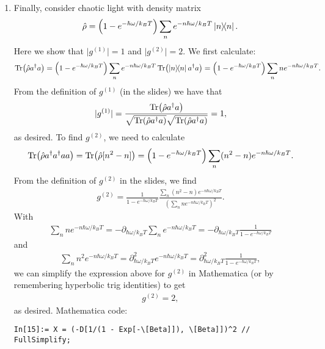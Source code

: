 \documentclass{article}
\theoremstyle{definition}
\newcommand{\p}{\partial}
\newcommand{\f}[2]{\frac{#1}{#2}}
\newcommand{\lp}{\left(}
\newcommand{\rp}{\right)}
\begin{document}
\begin{enumerate}[label=\alph*)]
\item Finally, consider chaotic light with density matrix
\begin{align*}
\hat{\rho} = \lp  1 - e^{-\hbar \omega / k_B T} \rp \sum_n e^{-n\hbar \omega / k_B T} \ketbra{n}.
\end{align*}
Here we show that $\vert g^{(1)} \vert = 1$ and $\vert g^{(2)} \vert = 2$. We first calculate:
\begin{align*}
\Tr(\hat{\rho}  a^\dagger a ) = \lp  1 - e^{-\hbar \omega / k_B T} \rp \sum_{n} e^{-n\hbar \omega /k_B T} \Tr(\ketbra{n} a^\dagger a ) = \lp  1 - e^{-\hbar \omega / k_B T} \rp \sum_n n e^{-n\hbar \omega/k_B T}. 
\end{align*}
From the definition of $g^{(1)}$ (in the slides) we have that
\begin{align*}
\vert g^{(1)}\vert = \f{\Tr(\hat{\rho} a^\dagger a )}{\sqrt{\Tr(\hat{\rho} a^\dagger a )}  \sqrt{\Tr(\hat{\rho} a^\dagger a )} } = 1,
\end{align*}
as desired. To find $g^{(2)}$, we need to calculate
\begin{align*}
\Tr(\hat{\rho} a^\dagger a^\dagger a a ) = \Tr(\hat{\rho}[n^2 - n]) = \lp 1 - e^{-\hbar \omega/k_B T} \rp \sum_n (n^2 - n) e^{-n\hbar \omega / k_B T}. 
\end{align*}
From the definition of $g^{(2)}$ in the slides, we find 
\begin{align*}
g^{(2)} = \f{1}{1 - e^{-\hbar \omega /k_B T}} \f{\sum_n (n^2 - n) e^{-n\hbar \omega / k_B T} }{\lp \sum_n n e^{-n\hbar \omega / k_B T} \rp^2}.
\end{align*}
With
\begin{align*}
\sum_n n e^{-n \hbar \omega / k_BT} = -\p_{\hbar \omega/k_B T} \sum_{n}e^{-n\hbar \omega / k_B T} = -\p_{\hbar \omega / k_B T} \f{1}{1 - e^{-\hbar \omega / k_BT}} 
\end{align*}
and 
\begin{align*}
\sum_{n} n^2 e^{-n \hbar \omega / k_B T} 
= \p^2_{\hbar \omega / k_BT} e^{-n\hbar \omega/k_BT} 
= \p^2_{\hbar \omega / k_BT} \f{1}{1 - e^{-\hbar \omega / k_BT}},
\end{align*}
we can simplify the expression above for $g^{(2)}$ in Mathematica (or by remembering hyperbolic trig identities) to get
\begin{align*}
g^{(2)} = 2,
\end{align*}
as desired. Mathematica code:

\begin{lstlisting}
In[15]:= X = (-D[1/(1 - Exp[-\[Beta]]), \[Beta]])^2 // FullSimplify;


\end{lstlisting}
\end{enumerate}
\end{document}
